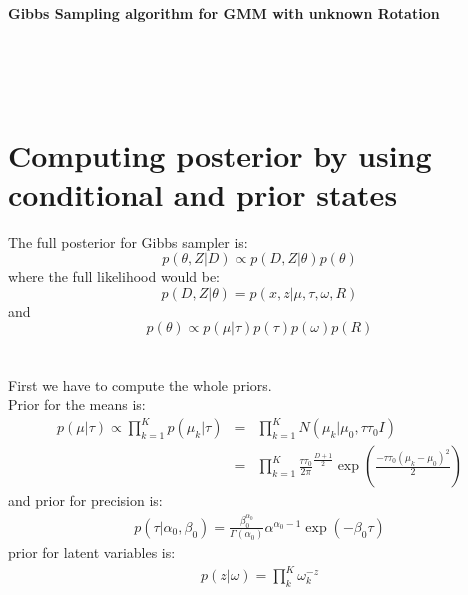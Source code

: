 \documentclass[11pt]{article}
\begin{document}
\noindent\textsf{\textbf{\Large Gibbs Sampling algorithm for GMM with unknown Rotation}}

\vspace*{1cm}\\

%
\\ \\

\section*{Computing posterior by using conditional and prior states}
The full posterior for Gibbs sampler is:
\begin{equation*}
p(\theta,Z | D)\propto p(D,Z|\theta)p(\theta)
\end{equation*}
where the full likelihood would be:
\begin{equation*}
p(D,Z|\theta)=p(x,z|\mu,\tau,\omega,R)
\end{equation*}
and 
\begin{equation*}
p(\theta)\propto p(\mu|\tau)p(\tau)p(\omega)p(R)
\end{equation*}\\\\
First we have to compute the whole priors.\\
Prior for the means is: \\
\begin{eqnarray*}
p(\mu|\tau) \propto \prod_{k=1}^K p(\mu_k|\tau) &=& \prod_{k=1}^K N(\mu_k|\mu_0,\tau\tau_0I) \\
&=& \prod_{k=1}^K\frac{\tau\tau_0}{2\pi}^{\frac{D+1}{2}}\exp{(\frac{-\tau\tau_0(\mu_k-\mu_0)^2}{2})}
\end{eqnarray*}
and prior for precision is: \\
\begin{eqnarray*}
p(\tau|\alpha_0,\beta_0)=\frac{\beta_0^{\alpha_0}}{\Gamma(\alpha_0)}\alpha^{\alpha_0-1}\exp(-\beta_0\tau)
\end{eqnarray*}
prior for latent variables is:
\begin{eqnarray*}
p(z|\omega)=\prod_k^K\omega_k^{-z}
\end{eqnarray*}
\end{document}
